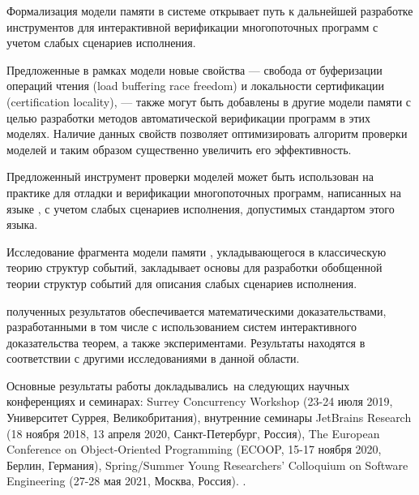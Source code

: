 {\influence}
Формализация модели памяти \Wkm в системе \coq открывает 
путь к дальнейшей разработке инструментов для  
интерактивной верификации многопоточных программ  
с учетом слабых сценариев исполнения.

Предложенные в рамках модели  \WkmS новые свойства ---
свобода от буферизации операций чтения (load buffering race freedom)
и локальности сертификации (certification locality), --- 
также могут быть добавлены в другие модели памяти 
с целью разработки методов автоматической верификации программ в этих моделях. 
Наличие данных свойств позволяет оптимизировать алгоритм 
проверки моделей и таким образом существенно увеличить его эффективность.

Предложенный инструмент проверки моделей может быть использован на практике
для отладки и верификации многопоточных программ, 
написанных на языке \CLANG, с учетом слабых сценариев исполнения, 
допустимых стандартом этого языка.

Исследование фрагмента модели памяти \Wkm, укладывающегося в
классическую теорию структур событий, закладывает основы
для разработки обобщенной теории структур событий для
описания слабых сценариев исполнения. 

{\reliability} полученных результатов обеспечивается 
математическими доказательствами, разработанными в том числе с использованием
систем интерактивного доказательства теорем, 
а также экспериментами. 
Результаты находятся в соответствии с другими исследованиями в данной области.

{\probation} Основные результаты работы докладывались~на
следующих научных конференциях и семинарах:
Surrey Concurrency Workshop (23-24 июля 2019, Университет Суррея, Великобритания), внутренние семинары JetBrains Research
(18 ноября 2018, 13 апреля 2020, Санкт-Петербург, Россия),
The European Conference on Object-Oriented Programming
(ECOOP, 15-17 ноября 2020, Берлин, Германия),
Spring/Summer Young Researchers' Colloquium on Software Engineering
(27-28 мая 2021, Москва, Россия). .


